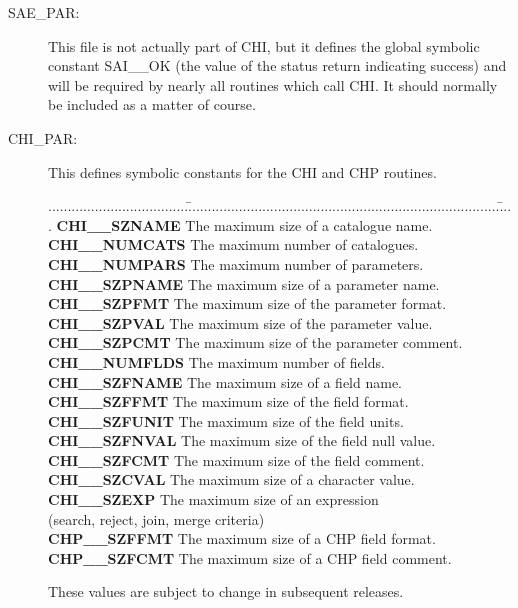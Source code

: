 \documentclass[11pt,nolof]{starlink}
\begin{document}
\begin{description}

\item [SAE\_PAR:]
This file is not actually part of CHI, but it defines the global symbolic
constant SAI\_\_OK (the value of the status return indicating success) and will
be required by nearly all routines which call CHI. It should normally be
included as a matter of course.

\item [CHI\_PAR:]
This defines symbolic constants for the CHI and CHP routines.

\begin{tabbing}
....................................\=................................................................................\=....\kill
\textbf{CHI\_\_SZNAME}    \>The maximum size of a catalogue name.     \\
\textbf{CHI\_\_NUMCATS}   \>The maximum number of catalogues.         \\
\textbf{CHI\_\_NUMPARS}   \>The maximum number of parameters.         \\
\textbf{CHI\_\_SZPNAME}   \>The maximum size of a parameter name.     \\
\textbf{CHI\_\_SZPFMT}    \>The maximum size of the parameter format. \\
\textbf{CHI\_\_SZPVAL}    \>The maximum size of the parameter value.  \\
\textbf{CHI\_\_SZPCMT}    \>The maximum size of the parameter comment.\\
\textbf{CHI\_\_NUMFLDS}   \>The maximum number of fields.             \\
\textbf{CHI\_\_SZFNAME}   \>The maximum size of a field name.         \\
\textbf{CHI\_\_SZFFMT}    \>The maximum size of the field format.     \\
\textbf{CHI\_\_SZFUNIT}   \>The maximum size of the field units.      \\
\textbf{CHI\_\_SZFNVAL}   \>The maximum size of the field null value. \\
\textbf{CHI\_\_SZFCMT}    \>The maximum size of the field comment.    \\
\textbf{CHI\_\_SZCVAL}    \>The maximum size of a character value.    \\
\textbf{CHI\_\_SZEXP}     \>The maximum size of an expression         \\
                       \>(search, reject, join, merge criteria)\\
\textbf{CHP\_\_SZFFMT}    \>The maximum size of a CHP field format.     \\
\textbf{CHP\_\_SZFCMT}    \>The maximum size of a CHP field comment.    \\
\end{tabbing}

These values are subject to change in subsequent releases.
\end{description}
\end{document}
